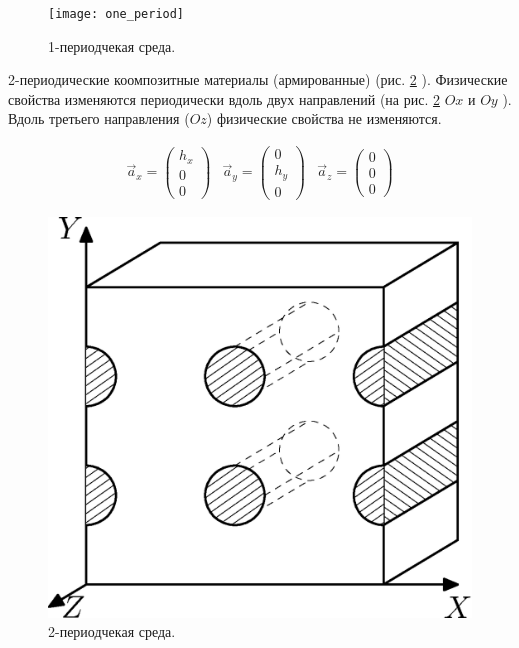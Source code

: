 \begin{figure} [ht] 
    \center
    \texttt{[image: one\_period]}
    \caption{1-периодчекая среда.} 
    \label{images:one_period}  
\end{figure}

2-периодические коомпозитные материалы (армированные) (рис. 
\ref{images:two_period}
).
Физические свойства изменяются периодически вдоль двух направлений (на рис. 
\ref{images:two_period} $Ox$
и 
$Oy$
).  Вдоль третьего направления 
($Oz$) 
физические свойства не изменяются. 

\begin{equation}
    \begin{array}{ccc}
    \vec{a}_x = \left(\begin{array}{c}h_x\\0\\0\end{array}\right) & 
    \vec{a}_y = \left(\begin{array}{c}0\\h_y\\0\end{array}\right) & 
    \vec{a}_z = \left(\begin{array}{c}0\\0\\0\end{array}\right)
    \end{array}
\end{equation}

\begin{figure} [ht] 
    \center
    \includegraphics [scale=0.5] {images/two_period}
    \caption{2-периодчекая среда.} 
    \label{images:two_period}  
\end{figure}

